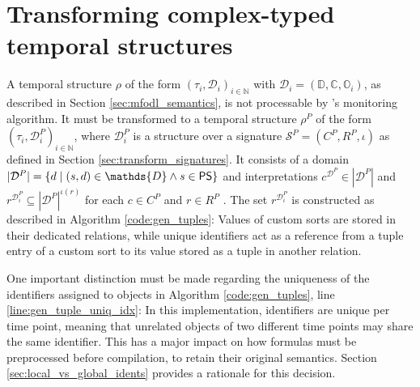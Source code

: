 \section{Transforming complex-typed temporal structures}
\label{sec:transform_temp_structure}
A temporal structure $\rho$ of the form $(\tau_i, \mathcal{D}_i)_{i \in \mathds{N}}$ with $\mathcal{D}_i = (\mathds{D}, \mathds{C}, \mathds{O}_i)$, as described in Section \ref{sec:mfodl_semantics}, is not processable by \MonPoly's monitoring algorithm. It must be transformed to a temporal structure $\rho^P$ of the form $(\tau_i, \mathcal{D}^P_i)_{i \in \mathds{N}}$, where $\mathcal{D}_i^P$ is a structure over a signature $\mathcal{S}^P = (C^P, R^P, \iota)$ as defined in Section \ref{sec:transform_signatures}. It consists of a domain $|\mathcal{D}^P| = \{ d \mid (s, d) \in \mathds{D} \land s \in \mfodlPrimitiveSorts \}$ and interpretations $c^{\mathcal{D}^P} \in |\mathcal{D}^{P}|$ and $r^{\mathcal{D}_i^P} \subseteq |\mathcal{D}^P|^{\iota(r)}$ for each $c \in C^P$ and $r \in R^P$ \cite{basinMonitoringMetricFirstorder2015}. The set $r^{\mathcal{D}_i^P}$ is constructed as described in Algorithm \ref{code:gen_tuples}: Values of custom sorts are stored in their dedicated relations, while unique identifiers act as a reference from a tuple entry of a custom sort to its value stored as a tuple in another relation.

One important distinction must be made regarding the uniqueness of the identifiers assigned to objects in Algorithm \ref{code:gen_tuples}, line \ref{line:gen_tuple_uniq_idx}: In this implementation, identifiers are unique per time point, meaning that unrelated objects of two different time points may share the same identifier. This has a major impact on how formulas must be preprocessed before compilation, to retain their original semantics. Section \ref{sec:local_vs_global_idents} provides a rationale for this decision.

